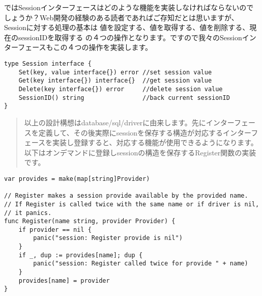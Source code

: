ではSessionインターフェースはどのような機能を実装しなければならないのでしょうか？Web開発の経験のある読者であればご存知だとは思いますが、Sessionに対する処理の基本は 値を設定する、値を取得する、値を削除する、現在のsessionIDを取得する の４つの操作となります。ですので我々のSessionインターフェースもこの４つの操作を実装します。

\begin{lstlisting}[numbers=none]
type Session interface {
    Set(key, value interface{}) error //set session value
    Get(key interface{}) interface{}  //get session value
    Delete(key interface{}) error     //delete session value
    SessionID() string                //back current sessionID
}
\end{lstlisting}

\begin{quote}
以上の設計構想はdatabase/sql/driverに由来します。先にインターフェースを定義して、その後実際にsessionを保存する構造が対応するインターフェースを実装し登録すると、対応する機能が使用できるようになります。以下はオンデマンドに登録しsessionの構造を保存するRegister関数の実装です。
\end{quote}


\begin{lstlisting}[numbers=none]
var provides = make(map[string]Provider)

// Register makes a session provide available by the provided name.
// If Register is called twice with the same name or if driver is nil,
// it panics.
func Register(name string, provider Provider) {
    if provider == nil {
        panic("session: Register provide is nil")
    }
    if _, dup := provides[name]; dup {
        panic("session: Register called twice for provide " + name)
    }
    provides[name] = provider
}
\end{lstlisting}


